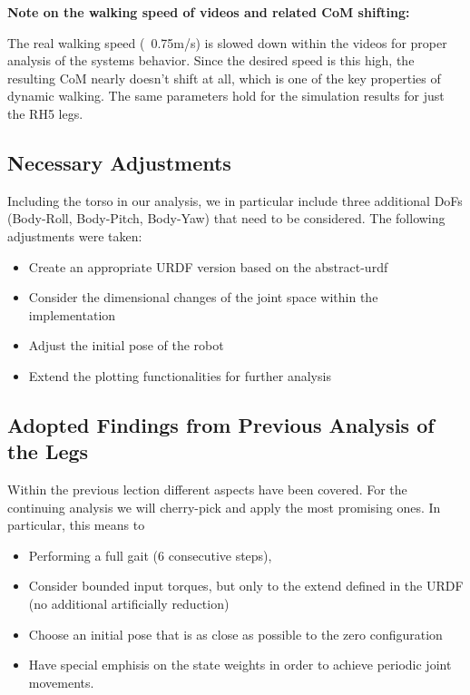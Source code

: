 \textbf{Note on the walking speed of videos and related CoM shifting:} 

The real walking speed (~0.75m/s) is slowed down within the videos for proper analysis of the systems behavior. Since the desired speed is this high, the resulting CoM nearly doesn't shift at all, which is one of the key properties of dynamic walking. The same parameters hold for the simulation results for just the RH5 legs.  


\subsection{Necessary Adjustments}
Including the torso in our analysis, we in particular include three additional DoFs (Body-Roll, Body-Pitch, Body-Yaw) that need to be considered. The following adjustments were taken:
\begin{itemize}
\item Create an appropriate URDF version based on the abstract-urdf
\item Consider the dimensional changes of the joint space within the implementation
\item Adjust the initial pose of the robot
\item Extend the plotting functionalities for further analysis
\end{itemize}

\subsection{Adopted Findings from Previous Analysis of the Legs}
Within the previous lection different aspects have been covered. For the continuing analysis we will cherry-pick and apply the most promising ones. In particular, this means to 
\begin{itemize}
\item Performing a full gait (6 consecutive steps),
\item Consider bounded input torques, but only to the extend defined in the URDF (no additional artificially reduction)
\item Choose an initial pose that is as close as possible to the zero configuration
\item Have special emphisis on the state weights in order to achieve periodic joint movements.
\end{itemize}

